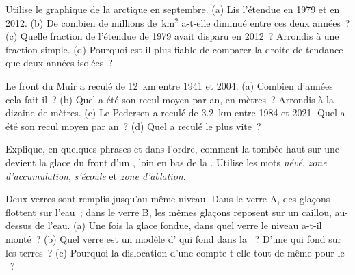 \begin{exercise}[$\star\star$]\label{exo:g8:ice-on-earth:5}
Utilise le graphique de la  arctique en septembre. (a) Lis
l'étendue en 1979 et en 2012. (b) De combien de millions de~km$^2$ a-t-elle
diminué entre ces deux années~? (c) Quelle fraction de l'étendue de 1979
avait disparu en 2012~? Arrondis à une fraction simple. (d) Pourquoi
est-il plus fiable de comparer la droite de tendance que deux années
isolées~?
\end{exercise}

\begin{exercise}[$\star\star$]\label{exo:g8:ice-on-earth:6}
Le front du  Muir a reculé de \qty{12}{km} entre 1941 et 2004.
(a) Combien d'années cela fait-il~? (b) Quel a été son recul moyen par
an, en mètres~? Arrondis à la dizaine de mètres. (c) Le  Pedersen a
reculé de \qty{3.2}{km} entre 1984 et 2021. Quel a été son recul moyen par
an~? (d) Quel  a reculé le plus vite~?
\end{exercise}

\begin{exercise}[$\star\star$]\label{exo:g8:ice-on-earth:7}
Explique, en quelques phrases et dans l'ordre, comment la  tombée
haut sur une  devient la glace du front d'un , loin en bas
de la . Utilise les mots \emph{névé}, \emph{zone d'accumulation},
\emph{s'écoule} et \emph{zone d'ablation}.
\end{exercise}

\begin{exercise}[$\star\star$]\label{exo:g8:ice-on-earth:8}
Deux verres sont remplis jusqu'au même niveau. Dans le verre A, des
glaçons flottent sur l'eau~; dans le verre B, les mêmes glaçons reposent
sur un caillou, au-dessus de l'eau. (a) Une fois la glace fondue, dans
quel verre le niveau a-t-il monté~? (b) Quel verre est un modèle d'
qui fond dans la ~? D'une  qui fond sur les terres~?
(c) Pourquoi la dislocation d'une  compte-t-elle tout
de même pour le ~?
\end{exercise}

